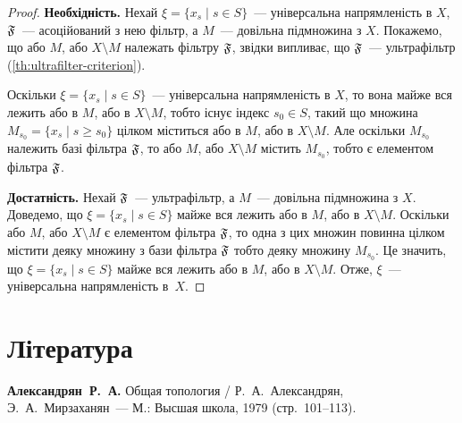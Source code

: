 \begin{proof}
    \textbf{Необхідність.} Нехай $\xi = \{x_s \mid s \in S\}$~--- універсальна напрямленість в $X$, $\frak F$~--- асоційований з нею фільтр, а $M$~--- довільна підмножина з $X$. Покажемо, що або $M$, або $X \setminus M$ належать фільтру $\frak F$, звідки випливає, що $\frak F$~--- ультрафільтр (\cref{th:ultrafilter-criterion}). 
    
    Оскільки $\xi = \{x_s \mid s \in S\}$~--- універсальна напрямленість в $X$, то вона майже вся лежить або в $M$, або в $X \setminus M$, тобто існує індекс $s_0 \in S$, такий що множина $M_{s_0} = \{x_s \mid s \ge s_0\}$ цілком міститься або в $M$, або в $X \setminus M$. Але оскільки $M_{s_0}$ належить базі фільтра $\frak F$, то або $M$, або $X \setminus M$ містить $M_{s_0}$, тобто є елементом фільтра $\frak F$. 
    
    \textbf{Достатність.} Нехай $\frak F$~--- ультрафільтр, а $M$~--- довільна підмножина з $X$. Доведемо, що $\xi = \{x_s \mid s \in S\}$ майже вся лежить або в $M$, або в $X \setminus M$. Оскільки або $M$, або $X \setminus M$ є елементом фільтра $\frak F$, то одна з цих множин повинна цілком містити деяку множину з бази фільтра $\frak F$ тобто деяку множину $M_{s_0}$. Це значить, що $\xi = \{x_s \mid s \in S\}$ майже вся лежить або в $M$, або в $X \setminus M$. Отже, $\xi$~--- універсальна напрямленість в~$X$.
\end{proof}

\section{Література}

\begin{enumerate}[label={[\arabic*]}]
\item \textbf{Александрян~Р.~А.}
Общая топология /
Р.~А.~Александрян, Э.~А.~Мирзаханян~---
М.: Высшая школа, 1979 (стр.~101--113).
\end{enumerate}
